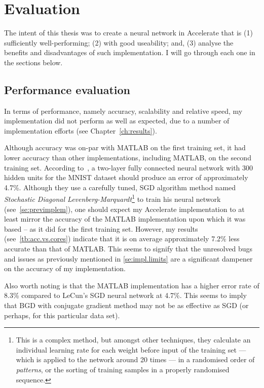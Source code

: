\chapter{Evaluation}\label{ch:eval}

The intent of this thesis was to create a neural network in Accelerate that is (1) sufficiently well-performing; (2) with good useability; and, (3) analyse the benefits and disadvantages of such implementation. I will go through each one in the sections below.

\section{Performance evaluation} \label{se:eval.performance}

In terms of performance, namely accuracy, scalability and relative speed, my implementation did not perform as well as expected, due to a number of implementation efforts (see Chapter~\ref{ch:results}).

Although accuracy was on-par with MATLAB on the first training set, it had lower accuracy than other implementations, including MATLAB, on the second training set. According to~\cite{LeC98}, a two-layer fully connected neural network with 300 hidden units for the MNIST dataset should produce an error of approximately 4.7\%. Although they use a carefully tuned, SGD algorithm method named \textit{Stochastic Diagonal Levenberg-Marquardt}\footnote{This is a complex method, but amongst other techniques, they calculate an individual learning rate for each weight before input of the training set --- which is applied to the network around 20 times --- in a randomised order of \textit{patterns}, or the sorting of training samples in a properly randomised sequence.} to train his neural network (see~\ref{se:previmplem}), one should expect my Accelerate implementation to at least mirror the accuracy of the MATLAB implementation upon which it was based -- as it did for the first training set. However, my results (see~\ref{tb:acc.vs.cores}) indicate that it is on average approximately 7.2\% less accurate than that of MATLAB. This seems to signify that the unresolved bugs and issues as previously mentioned in \ref{se:impl.limits} are a significant dampener on the accuracy of my implementation.

Also worth noting is that the MATLAB implementation has a higher error rate of 8.3\% compared to LeCun's SGD neural network at 4.7\%. This seems to imply that BGD with conjugate gradient method may not be as effective as SGD (or perhaps, for this particular data set). 

